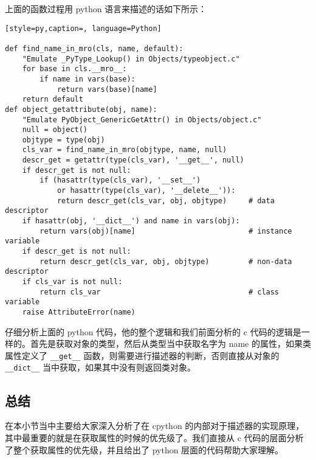 上面的函数过程用 python 语言来描述的话如下所示：
\begin{lstlisting}[style=py,caption=, language=Python]

def find_name_in_mro(cls, name, default):
    "Emulate _PyType_Lookup() in Objects/typeobject.c"
    for base in cls.__mro__:
        if name in vars(base):
            return vars(base)[name]
    return default
def object_getattribute(obj, name):
    "Emulate PyObject_GenericGetAttr() in Objects/object.c"
    null = object()
    objtype = type(obj)
    cls_var = find_name_in_mro(objtype, name, null)
    descr_get = getattr(type(cls_var), '__get__', null)
    if descr_get is not null:
        if (hasattr(type(cls_var), '__set__')
            or hasattr(type(cls_var), '__delete__')):
            return descr_get(cls_var, obj, objtype)     # data descriptor
    if hasattr(obj, '__dict__') and name in vars(obj):
        return vars(obj)[name]                          # instance variable
    if descr_get is not null:
        return descr_get(cls_var, obj, objtype)         # non-data descriptor
    if cls_var is not null:
        return cls_var                                  # class variable
    raise AttributeError(name)
\end{lstlisting}
仔细分析上面的 python 代码，他的整个逻辑和我们前面分析的 c 代码的逻辑是一样的。首先是获取对象的类型，然后从类型当中获取名字为 name 的属性，如果类属性定义了 \verb|__get__| 函数，则需要进行描述器的判断，否则直接从对象的 \verb|__dict__| 当中获取，如果其中没有则返回类对象。
\subsection{总结}
在本小节当中主要给大家深入分析了在 cpython 的内部对于描述器的实现原理，其中最重要的就是在获取属性的时候的优先级了。我们直接从 c 代码的层面分析了整个获取属性的优先级，并且给出了 python 层面的代码帮助大家理解。